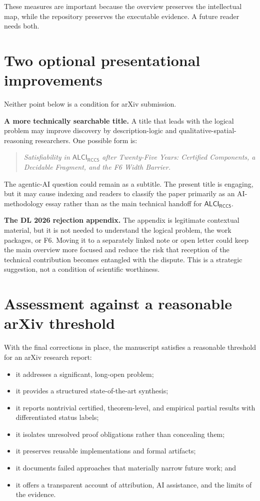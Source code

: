 \documentclass[11pt]{article}
\newcommand{\logic}{\ensuremath{\mathsf{ALCI}_{\mathsf{RCC5}}}\xspace}
\begin{document}
These measures are important because the overview preserves the intellectual map, while the repository preserves the executable evidence. A future reader needs both.

\section{Two optional presentational improvements}

Neither point below is a condition for arXiv submission.

\textbf{A more technically searchable title.} A title that leads with the logical problem may improve discovery by description-logic and qualitative-spatial-reasoning researchers. One possible form is:

\begin{quote}
\emph{Satisfiability in \logic after Twenty-Five Years: Certified Components, a Decidable Fragment, and the F6 Width Barrier.}
\end{quote}

The agentic-AI question could remain as a subtitle. The present title is engaging, but it may cause indexing and readers to classify the paper primarily as an AI-methodology essay rather than as the main technical handoff for \logic.

\textbf{The DL 2026 rejection appendix.} The appendix is legitimate contextual material, but it is not needed to understand the logical problem, the work packages, or F6. Moving it to a separately linked note or open letter could keep the main overview more focused and reduce the risk that reception of the technical contribution becomes entangled with the dispute. This is a strategic suggestion, not a condition of scientific worthiness.

\section{Assessment against a reasonable arXiv threshold}

With the final corrections in place, the manuscript satisfies a reasonable threshold for an arXiv research report:

\begin{itemize}
  \item it addresses a significant, long-open problem;
  \item it provides a structured state-of-the-art synthesis;
  \item it reports nontrivial certified, theorem-level, and empirical partial results with differentiated status labels;
  \item it isolates unresolved proof obligations rather than concealing them;
  \item it preserves reusable implementations and formal artifacts;
  \item it documents failed approaches that materially narrow future work; and
  \item it offers a transparent account of attribution, AI assistance, and the limits of the evidence.
\end{itemize}
\end{document}
